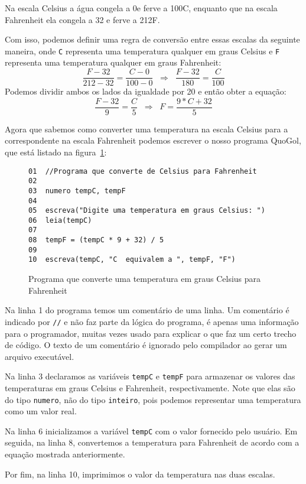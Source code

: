 \documentclass{report}
\newcommand{\Qgol}{QuoGol\;}
\begin{document}
Na escala Celsius a água congela a 0\degree e ferve a 100\degree C,
enquanto que na escala Fahrenheit ela congela a 32\degree
e ferve a 212\degree F.

Com isso, podemos definir uma regra de conversão entre essas escalas
da seguinte maneira, onde \texttt{C} representa uma temperatura qualquer
em graus Celsius e \texttt{F} representa uma temperatura qualquer em
graus Fahrenheit:
\[
\frac{F-32}{212-32} = \frac{C-0}{100-0}  \;\;\Rightarrow\;\;  \frac{F-32}{180}  =  \frac{C}{100}
\]
Podemos dividir ambos os lados da igualdade por 20 e então obter a equação:
\[
\frac{F-32}{9} = \frac{C}{5}  \;\;\Rightarrow\;\;  F = \frac{9*C + 32}{5}
\]

Agora que sabemos como converter uma temperatura na escala Celsius para a
correspondente na escala Fahrenheit podemos escrever o nosso programa \Qgol,
que está listado na figura~\ref{fig:celsius}:

\begin{figure}
\begin{verbatim}
01  //Programa que converte de Celsius para Fahrenheit
02
03  numero tempC, tempF
04
05  escreva("Digite uma temperatura em graus Celsius: ")
06  leia(tempC)
07
08  tempF = (tempC * 9 + 32) / 5
09
10  escreva(tempC, "C  equivalem a ", tempF, "F")
\end{verbatim}
\caption{Programa que converte uma temperatura em graus Celsius para Fahrenheit}
\label{fig:celsius}
\end{figure}

Na linha 1 do programa temos um comentário de uma linha. Um comentário é indicado
por \texttt{//} e não faz parte da lógica do programa, é apenas uma informação para
o programador, muitas vezes usado para explicar o que faz um certo trecho de código.
O texto de um comentário é ignorado pelo compilador ao gerar um arquivo executável.

Na linha 3 declaramos as variáveis \texttt{tempC} e \texttt{tempF} para armazenar
os valores das temperaturas em graus Celsius e Fahrenheit, respectivamente. Note
que elas são do tipo \texttt{numero}, não do tipo \texttt{inteiro}, pois podemos
representar uma temperatura como um valor real.

Na linha 6 inicializamos a variável \texttt{tempC} com o valor fornecido pelo usuário.
Em seguida, na linha 8, convertemos a temperatura para Fahrenheit de acordo com a
equação mostrada anteriormente.

Por fim, na linha 10, imprimimos o valor da temperatura nas duas escalas.
\end{document}
